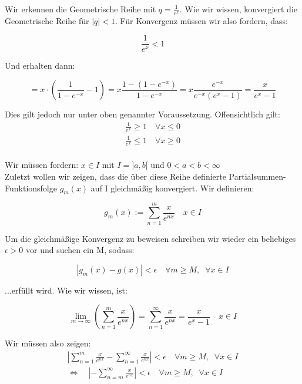 \documentclass[a4paper,german,12pt,smallheadings]{scrartcl}
\begin{document}
Wir erkennen die Geometrische Reihe mit $q=\frac{1}{e^x}$. Wie wir wissen, konvergiert die Geometrische Reihe für $|q|<1$. Für Konvergenz müssen wir also fordern, dass:

\begin{equation*}
\frac{1}{e^x}<1
\end{equation*}

Und erhalten dann:

\begin{equation*}
    = x \cdot \left( \frac{1}{1-e^{-x}} - 1 \right) = x \frac{1 - (1-e^{-x})}{1-e^{-x}} = x \frac{e^{-x}}{e^{-x} (e^x - 1)} = \frac{x}{e^x-1}
\end{equation*}

Dies gilt jedoch nur unter oben genannter Voraussetzung. Offensichtlich gilt:
\begin{align*}
\frac{1}{e^x}\geq 1 \quad \forall x\leq 0\\
\frac{1}{e^x}\le 1 \quad \forall x\ge 0\\
\end{align*}

Wir müssen fordern: $x\in I$ mit $I=]a,b[$ und $0<a<b<\infty$\\
Zuletzt wollen wir zeigen, dass die über diese Reihe definierte Partialsummen-Funktionsfolge $g_m(x)$ auf I gleichmäßig konvergiert. Wir definieren:

\begin{equation*}
g_m(x):=\sum_{n=1}^{m}\frac{x}{e^{nx}} \quad x\in I
\end{equation*}

Um die gleichmäßige Konvergenz zu beweisen schreiben wir wieder ein beliebiges $\epsilon>0$ vor und suchen ein M, sodass:

\begin{equation}
|g_m(x)-g(x)|<\epsilon \quad \forall m\geq M, \;\; \forall x\in I
\end{equation}

...erfüllt wird. Wie wir wissen, ist:

\begin{equation*}
\lim\limits_{m \to \infty}\left(\sum_{n=1}^{m}\frac{x}{e^{nx}}\right)=\sum_{n=1}^{\infty}\frac{x}{e^{nx}}=\frac{x}{e^x-1} \quad x\in I
\end{equation*}

Wir müssen also zeigen:
\begin{align*}
\left|\sum_{n=1}^{m}\frac{x}{e^{nx}}-\sum_{n=1}^{\infty}\frac{x}{e^{nx}}\right| < \epsilon \quad \forall m\geq M, \;\; \forall x \in I\\
\Leftrightarrow \quad \left|-\sum_{n=m}^{\infty}\frac{x}{e^{nx}}\right| < \epsilon \quad \forall m\geq M, \;\; \forall x \in I
\end{align*}
\end{document}
